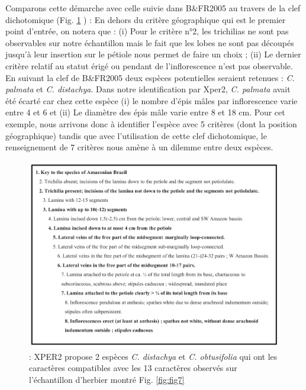 \documentclass[a4paper]{article}
\theoremstyle{definition}
\theoremstyle{definition}
\theoremstyle{definition}
\theoremstyle{remark}
\begin{document}
Comparons cette démarche avec celle suivie dans B\&FR2005 au travers de
la clef dichotomique (Fig. \ref{fig:fig9} ) : En dehors du critère
géographique qui est le premier point d'entrée, on notera que : (i) Pour
le critère n°2, les trichilias ne sont pas observables sur notre
échantillon mais le fait que les lobes ne sont pas découpés jusqu'à leur
insertion sur le pétiole nous permet de faire un choix ; (ii) Le dernier
critère relatif au statut érigé ou pendant de l'inflorescence n'est pas
observable. En suivant la clef de B\&FR2005 deux espèces potentielles
seraient retenues : \emph{C. palmata} et \emph{C. distachya}. Dans notre
identification par Xper2, \emph{C. palmata} avait été écarté car chez
cette espèce (i) le nombre d'épis mâles par inflorescence varie entre 4
et 6 et (ii) Le diamètre des épis mâle varie entre 8 et 18 cm. Pour cet
exemple, nous arrivons donc à identifier l'espèce avec 5 critères (dont
la position géographique) tandis que avec l'utilisation de cette clef
dichotomique, le renseignement de 7 critères nous amène à un dilemme
entre deux espèces.





\begin{figure}[H]

{\centering \includegraphics[width=1\linewidth]{figure/fig9} 

}

\caption{: XPER2 propose 2 espèces \emph{C. distachya} et \emph{C.
obtusifolia} qui ont les caractères compatibles avec les 13 caractères
observés sur l'échantillon d'herbier montré Fig. \ref{fig:fig7}}\label{fig:fig9}
\end{figure}
\end{document}
